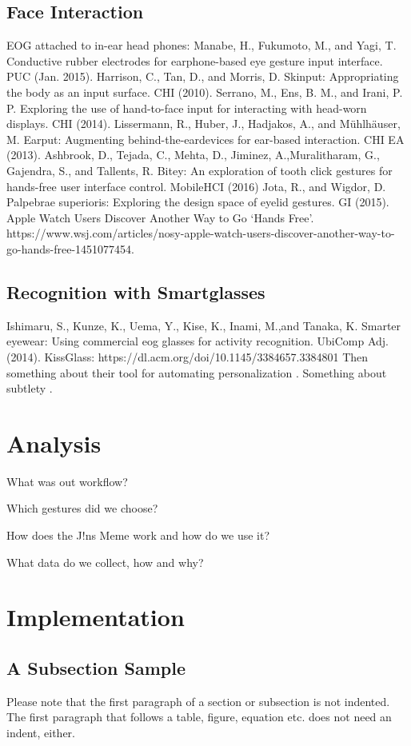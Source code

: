 \documentclass[runningheads]{llncs}
\begin{document}
\subsection{Face Interaction}
EOG attached to in-ear head phones: Manabe, H., Fukumoto, M., and Yagi, T. Conductive rubber electrodes for earphone-based eye gesture input interface. PUC (Jan. 2015).
Harrison, C., Tan, D., and Morris, D. Skinput: Appropriating the body as an input surface. CHI (2010).
Serrano, M., Ens, B. M., and Irani, P. P. Exploring the use of hand-to-face input for interacting with head-worn displays. CHI (2014).
Lissermann, R., Huber, J., Hadjakos, A., and Mühlhäuser, M. Earput: Augmenting behind-the-eardevices for ear-based interaction. CHI EA (2013).
Ashbrook, D., Tejada, C., Mehta, D., Jiminez, A.,Muralitharam, G., Gajendra, S., and Tallents, R. Bitey: An exploration of tooth click gestures for hands-free user interface control. MobileHCI (2016)
Jota, R., and Wigdor, D. Palpebrae superioris: Exploring the design space of eyelid gestures. GI (2015).
Apple Watch Users Discover Another Way to Go ‘Hands Free’. https://www.wsj.com/articles/nosy-apple-watch-users-discover-another-way-to-go-hands-free-1451077454.
\subsection{Recognition with Smartglasses}
Ishimaru, S., Kunze, K., Uema, Y., Kise, K., Inami, M.,and Tanaka, K. Smarter eyewear: Using commercial eog glasses for activity recognition. UbiComp Adj. (2014).
KissGlass: https://dl.acm.org/doi/10.1145/3384657.3384801
Then something about their tool for automating personalization \cite{10.1145/3174910.3174953}.
Something about subtlety \cite{10.1145/3290605.3300648}. 

\section{Analysis}
What was out workflow?

Which gestures did we choose?

How does the J!ns Meme work and how do we use it?

What data do we collect, how and why?

\section{Implementation}
\subsection{A Subsection Sample}
Please note that the first paragraph of a section or subsection is
not indented. The first paragraph that follows a table, figure,
equation etc. does not need an indent, either.
\end{document}
